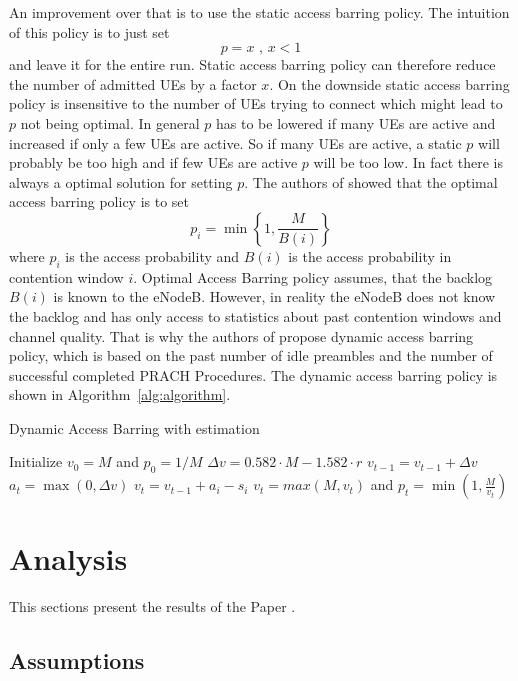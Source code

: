 \documentclass[conference]{IEEEtran}
\begin{document}
An improvement over that is to use the static access barring policy.
The intuition of this policy is to just set \[p=x \text{ ,  } x<1\] and leave it for the entire run.
Static access barring policy can therefore reduce the number of admitted UEs by a factor $x$.
On the downside static access barring policy is insensitive to the number of UEs trying to connect which might lead to $p$ not being optimal.
In general $p$ has to be lowered if many UEs are active and increased if only a few UEs are active.
So if many UEs are active, a static $p$ will probably be too high and if few UEs are active $p$ will be too low.
In fact there is always a optimal solution for setting $p$.
The authors of \cite{1057315} showed that the optimal access barring policy is to set \[p_i = \min\left\{1, \frac{M}{B(i)}\right\}\]
where $p_i$ is the access probability and $B(i)$ is the access probability in contention window $i$.
Optimal Access Barring policy assumes, that the backlog $B(i)$ is known to the eNodeB.
However, in reality the eNodeB does not know the backlog and has only access to statistics about past contention windows and channel quality.
That is why the authors of \cite{7875393} propose dynamic access barring policy, which is based on the past number of idle preambles and the number of successful completed PRACH Procedures. The dynamic access barring policy is shown in Algorithm~\ref{alg:algorithm}.
\begin{algorithm}
    \caption{Dynamic Access Barring with estimation \cite{7875393}}\label{alg:algorithm}
\begin{algorithmic}[1]
    \State Initialize $v_0=M$ and $p_0=1/M$
        \State $\Delta v = 0.582\cdot M - 1.582\cdot r$
        \State $v_{t-1} =v_{t-1}+\Delta v$
        \State $a_t = \max(0, \Delta v)$
        \State $v_t =v_{t-1}+a_i-s_i$
    \EndIf
    \State $v_t= max(M, v_t)$ and $p_t =\min\left(1,\frac{M}{v_t}\right)$
\end{algorithmic}
\end{algorithm}



\section{Analysis}
This sections present the results of the Paper \cite{8422323}.
\subsection{Assumptions}\label{assumptions_analysis}
\end{document}
